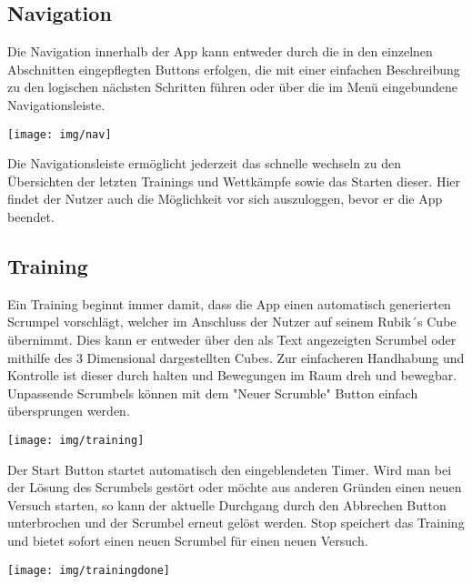 \documentclass[a4paper]{article}
\begin{document}
	\subsection*{Navigation}
	Die Navigation innerhalb der App kann entweder durch die in den einzelnen Abschnitten eingepflegten Buttons erfolgen, die mit einer einfachen Beschreibung zu den logischen nächsten Schritten führen oder über die im Menü eingebundene Navigationsleiste.
	\begin{center}
		\texttt{[image: img/nav]}
	\end{center}
	Die Navigationsleiste ermöglicht jederzeit das schnelle wechseln zu den Übersichten der letzten Trainings und Wettkämpfe sowie das Starten dieser. Hier findet der Nutzer auch die Möglichkeit vor sich auszuloggen, bevor er die App beendet.  
	\subsection*{Training}
	Ein Training beginnt immer damit, dass die App einen automatisch generierten Scrumpel vorschlägt, welcher im Anschluss der Nutzer auf seinem Rubik´s Cube übernimmt. Dies kann er entweder über den als Text angezeigten Scrumbel oder mithilfe des 3 Dimensional dargestellten Cubes. Zur einfacheren Handhabung und Kontrolle ist dieser durch halten und Bewegungen im Raum dreh und bewegbar. Unpassende Scrumbels können mit dem "Neuer Scrumble" Button einfach übersprungen werden.
	\begin{center}
		\texttt{[image: img/training]}
	\end{center} 
	Der Start Button startet automatisch den eingeblendeten Timer. Wird man bei der Lösung des Scrumbels gestört oder möchte aus anderen Gründen einen neuen Versuch starten, so kann der aktuelle Durchgang durch den Abbrechen Button unterbrochen und der Scrumbel erneut gelöst werden. Stop speichert das Training und bietet sofort einen neuen Scrumbel für einen neuen Versuch. 
	\begin{center}
		\texttt{[image: img/trainingdone]}
	\end{center}
\end{document}
